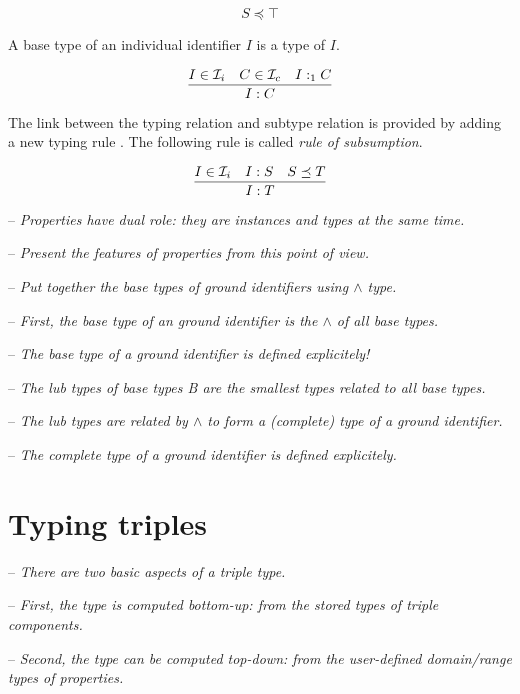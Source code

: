 \documentclass[runningheads]{llncs}
\newcommand{\Ii}{{\cal I}_i}
\newcommand{\Ic}{{\cal I}_c}
\newcommand{\notes}[1]{\noindent\begin{small}-- \emph{#1}\\\end{small}}
\begin{document}
\begin{equation}
S\preceq\top
\end{equation}


A base type of an individual identifier $I$ is a type of $I$.

\begin{equation}
\dfrac{I\in\Ii \quad C\in\Ic \quad I:_1\/C}
      {I:C}
\end{equation}

The link between the typing relation and subtype relation is
provided by adding a new typing rule \cite{Pierce02TypesProgLang}. The
following rule is called \emph{rule of subsumption}.

\begin{equation}
\dfrac{I\in\Ii \quad I:S \quad S\preceq\/T}
      {I:T}    
\end{equation}


\notes{Properties have dual role: they are instances and types at the same time.}
\notes{Present the features of properties from this point of view.}


\notes{Put together the base types of ground identifiers using $\land$ type.}
\notes{First, the base type of an ground identifier is the $\land$ of all base types.}
\notes{The \emph{base type} of a ground identifier is defined explicitely!}

\notes{The lub types of base types B are the smallest types related to all base types.}
\notes{The lub types are related by $\land$ to form a (complete) type of a ground identifier.}
\notes{The complete type of a ground identifier is defined explicitely.}








\section{Typing triples}


\notes{There are two basic aspects of a triple type.}
\notes{First, the type is computed bottom-up: from the stored types of triple components.}
\notes{Second, the type can be computed top-down: from the user-defined domain/range types of properties.}
\end{document}
